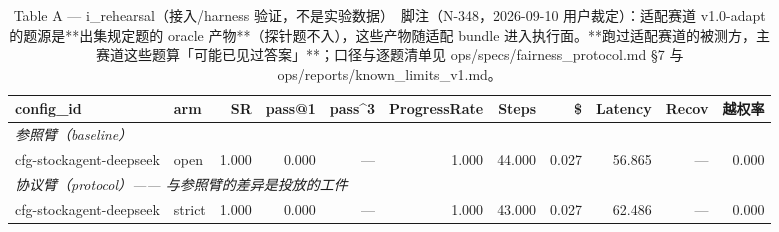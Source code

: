\begin{table}[t]
\centering
\caption{Table A — i\_rehearsal（接入/harness 验证，不是实验数据）　脚注（N-348，2026-09-10 用户裁定）：适配赛道 v1.0-adapt 的题源是**出集规定题的 oracle 产物**（探针题不入），这些产物随适配 bundle 进入执行面。**跑过适配赛道的被测方，主赛道这些题算「可能已见过答案」**；口径与逐题清单见 ops/specs/fairness\_protocol.md §7 与 ops/reports/known\_limits\_v1.md。}
\label{tab:a-i_rehearsal}
\begin{tabular}{llrrrrrrrrr}
\toprule
config\_id & arm & SR & pass@1 & pass\^{}3 & ProgressRate & Steps & \$ & Latency & Recov & 越权率 \\
\midrule
\multicolumn{11}{l}{\textit{参照臂（baseline）}} \\
cfg-stockagent-deepseek & open & 1.000 & 0.000 & --- & 1.000 & 44.000 & 0.027 & 56.865 & --- & 0.000 \\
\midrule
\multicolumn{11}{l}{\textit{协议臂（protocol）—— 与参照臂的差异是投放的工件}} \\
cfg-stockagent-deepseek & strict & 1.000 & 0.000 & --- & 1.000 & 43.000 & 0.027 & 62.486 & --- & 0.000 \\
\bottomrule
\end{tabular}
\end{table}

